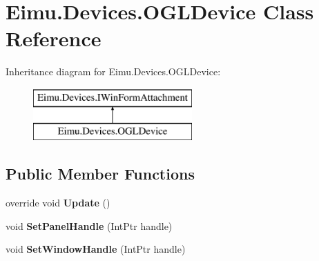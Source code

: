 \hypertarget{class_eimu_1_1_devices_1_1_o_g_l_device}{
\section{Eimu.Devices.OGLDevice Class Reference}
\label{class_eimu_1_1_devices_1_1_o_g_l_device}
}
Inheritance diagram for Eimu.Devices.OGLDevice:\begin{figure}[H]
\begin{center}
\leavevmode
\includegraphics[height=2.000000cm]{class_eimu_1_1_devices_1_1_o_g_l_device}
\end{center}
\end{figure}
\subsection*{Public Member Functions}
\begin{DoxyCompactItemize}
\item 
\hypertarget{class_eimu_1_1_devices_1_1_o_g_l_device_a0e35423fec84284b51f69af82f08a2ae}{
override void {\bfseries Update} ()}
\label{class_eimu_1_1_devices_1_1_o_g_l_device_a0e35423fec84284b51f69af82f08a2ae}

\item 
\hypertarget{class_eimu_1_1_devices_1_1_o_g_l_device_a061e6e3ea11ac2c4c0a858328ef0a6c4}{
void {\bfseries SetPanelHandle} (IntPtr handle)}
\label{class_eimu_1_1_devices_1_1_o_g_l_device_a061e6e3ea11ac2c4c0a858328ef0a6c4}

\item 
\hypertarget{class_eimu_1_1_devices_1_1_o_g_l_device_a18537452ddc26c601ebdf900d72b1121}{
void {\bfseries SetWindowHandle} (IntPtr handle)}
\label{class_eimu_1_1_devices_1_1_o_g_l_device_a18537452ddc26c601ebdf900d72b1121}

\end{DoxyCompactItemize}
